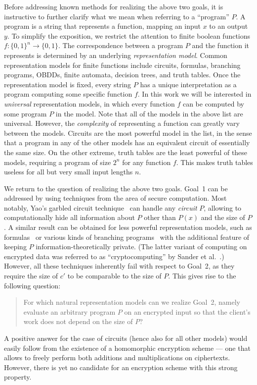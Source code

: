 \documentclass[11pt]{article}
\begin{document}
Before addressing known methods for realizing the above two
goals, it is instructive to further clarify what we mean when
referring to a ``program'' $P$. A program is a string that
represents a function, mapping an input $x$ to an output $y$. To
simplify the exposition, we restrict the attention to finite
boolean functions $f:\{0,1\}^n\to\{0,1\}$. The correspondence
between a program $P$ and the function it represents is
determined by an underlying {\em representation model}. Common
representation models for finite functions include circuits,
formulas, branching programs, OBDDs, finite automata, decision
trees, and truth tables. Once the representation model is fixed,
every string $P$ has a unique interpretation as a program
computing some specific function $f$. In this work we will be
interested in {\em universal} representation models, in which
every function $f$ can be computed by some program $P$ in the
model. Note that all of the models in the above list are
universal.  However, the {\em complexity} of representing a
function can greatly vary between the models.
Circuits are the most powerful model in the list, in the sense
that a program in any of the other models has an equivalent
circuit of essentially the same size. On the other extreme,
truth tables are the least powerful of these models, requiring
a program of size $2^n$ for any function $f$. This makes truth
tables useless for all but very small input lengths $n$.

We return to the question of realizing the above two goals. Goal~1
can be addressed by using techniques from the area of secure
computation.  Most notably, Yao's garbled circuit
technique~\cite{yao86,cckm00,LP04} can handle any {\em circuit} $P$,
allowing to computationally hide all information about $P$ other
than $P(x)$ and the size of $P$. A similar result can be obtained
for less powerful representation models, such as
formulas~\cite{syy99,K,Kol} or various kinds of branching
programs~\cite{beaver00,FKN94,ik00,Rap} with the additional feature of
keeping $P$ information-theoretically private. (The latter variant
of computing on encrypted data was referred to as
``cryptocomputing'' by Sander et al.~\cite{syy99}.) However, all
these techniques inherently fail with respect to Goal~2, as they
require the size of $c'$ to be comparable to the size of $P$. This
gives rise to the following question:
\begin{quote}
For which natural representation models can we realize Goal~2,
namely evaluate an arbitrary program $P$ on an encrypted input
so that the client's work does not depend on the size of $P$?
\end{quote}
A positive answer for the case of circuits (hence also for all
other models) would easily follow from the existence of a 
homomorphic encryption scheme --- one that allows to freely perform
both additions and multiplications on ciphertexts. However, there
is yet no candidate for an encryption scheme with this strong
property.
\end{document}

